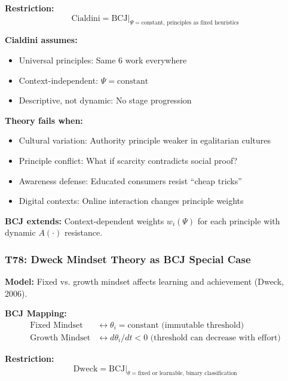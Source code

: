 \textbf{Restriction:}
\begin{equation}
\text{Cialdini} = \text{BCJ} \big|_{\Psi = \text{constant}, \, \text{principles as fixed heuristics}}
\end{equation}

\begin{tcolorbox}[colback=red!5!white, colframe=red!75!black,
    title=Boundary Condition: Where Cialdini Fails]
\textbf{Cialdini assumes:}
\begin{itemize}[nosep]
\item Universal principles: Same 6 work everywhere
\item Context-independent: $\Psi = \text{constant}$
\item Descriptive, not dynamic: No stage progression
\end{itemize}

\textbf{Theory fails when:}
\begin{itemize}[nosep]
\item Cultural variation: Authority principle weaker in egalitarian cultures
\item Principle conflict: What if scarcity contradicts social proof?
\item Awareness defense: Educated consumers resist ``cheap tricks''
\item Digital contexts: Online interaction changes principle weights
\end{itemize}

\textbf{BCJ extends:} Context-dependent weights $w_i(\Psi)$ for each principle with dynamic $A(\cdot)$ resistance.
\end{tcolorbox}

\subsubsection*{T78: Dweck Mindset Theory as BCJ Special Case}

\textbf{Model:} Fixed vs. growth mindset affects learning and achievement (Dweck, 2006).

\textbf{BCJ Mapping:}
\begin{align}
\text{Fixed Mindset} &\leftrightarrow \theta_i = \text{constant (immutable threshold)} \\
\text{Growth Mindset} &\leftrightarrow d\theta_i/dt < 0 \text{ (threshold can decrease with effort)}
\end{align}

\textbf{Restriction:}
\begin{equation}
\text{Dweck} = \text{BCJ} \big|_{\theta = \text{fixed or learnable}, \, \text{binary classification}}
\end{equation}

